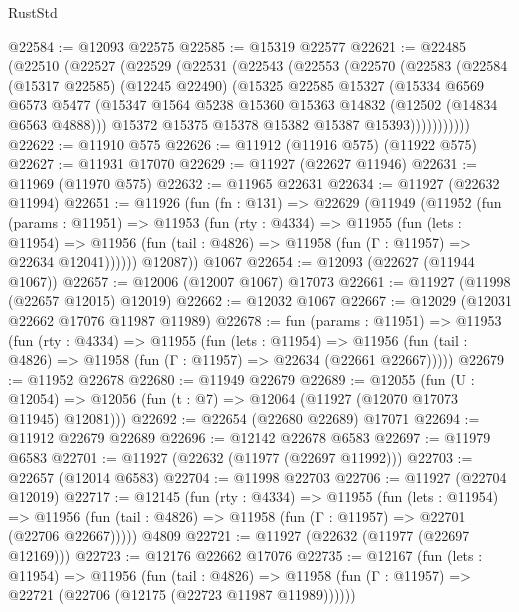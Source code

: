 \begin{lexlean}{RustStd}
\begin{coremodule}
@22584 := @12093 @22575
@22585 := @15319 @22577
@22621 := @22485
    (@22510
      (@22527
        (@22529
          (@22531
            (@22543
              (@22553
                (@22570
                  (@22583
                    (@22584
                      (@15317 @22585)
                      (@12245 @22490)
                      (@15325
                        @22585
                        @15327
                        (@15334
                          @6569
                          @6573
                          @5477
                          (@15347 @1564 @5238 @15360 @15363 @14832 (@12502 (@14834 @6563 @4888)))
                          @15372
                          @15375
                          @15378
                          @15382
                          @15387
                          @15393)))))))))))
@22622 := @11910 @575
@22626 := @11912 (@11916 @575) (@11922 @575)
@22627 := @11931 @17070
@22629 := @11927 (@22627 @11946)
@22631 := @11969 (@11970 @575)
@22632 := @11965 @22631
@22634 := @11927 (@22632 @11994)
@22651 := @11926
    (fun (fn : @131) =>
    @22629
      (@11949
        (@11952
          (fun (params : @11951) =>
          @11953
            (fun (rty : @4334) =>
            @11955
              (fun (lets : @11954) =>
              @11956 (fun (tail : @4826) => @11958 (fun (Γ : @11957) => @22634 @12041))))))
        @12087))
    @1067
@22654 := @12093 (@22627 (@11944 @1067))
@22657 := @12006 (@12007 @1067) @17073
@22661 := @11927 (@11998 (@22657 @12015) @12019)
@22662 := @12032 @1067
@22667 := @12029 (@12031 @22662 @17076 @11987 @11989)
@22678 := fun (params : @11951) =>
  @11953
    (fun (rty : @4334) =>
    @11955
      (fun (lets : @11954) =>
      @11956 (fun (tail : @4826) => @11958 (fun (Γ : @11957) => @22634 (@22661 @22667)))))
@22679 := @11952 @22678
@22680 := @11949 @22679
@22689 := @12055
    (fun (U : @12054) => @12056 (fun (t : @7) => @12064 (@11927 (@12070 @17073 @11945) @12081)))
@22692 := @22654 (@22680 @22689) @17071
@22694 := @11912 @22679 @22689
@22696 := @12142 @22678 @6583
@22697 := @11979 @6583
@22701 := @11927 (@22632 (@11977 (@22697 @11992)))
@22703 := @22657 (@12014 @6583)
@22704 := @11998 @22703
@22706 := @11927 (@22704 @12019)
@22717 := @12145
    (fun (rty : @4334) =>
    @11955
      (fun (lets : @11954) =>
      @11956 (fun (tail : @4826) => @11958 (fun (Γ : @11957) => @22701 (@22706 @22667)))))
    @4809
@22721 := @11927 (@22632 (@11977 (@22697 @12169)))
@22723 := @12176 @22662 @17076
@22735 := @12167
    (fun (lets : @11954) =>
    @11956
      (fun (tail : @4826) =>
      @11958 (fun (Γ : @11957) => @22721 (@22706 (@12175 (@22723 @11987 @11989))))))

\end{coremodule}
\end{lexlean}
